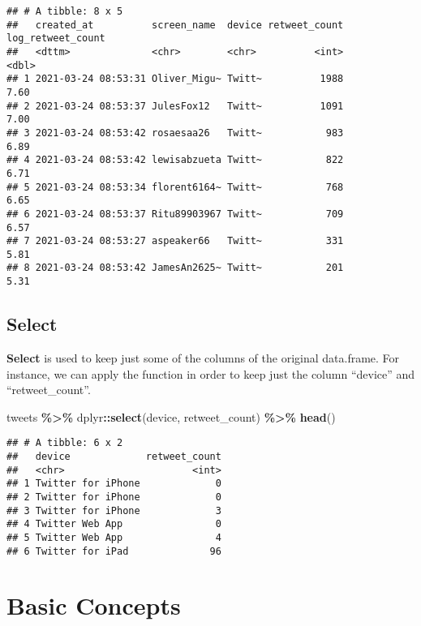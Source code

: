 \documentclass[
]{article}
\newenvironment{Shaded}{\begin{snugshade}}{\end{snugshade}}
\newcommand{\FunctionTok}[1]{\textcolor[rgb]{0.13,0.29,0.53}{\textbf{#1}}}
\newcommand{\NormalTok}[1]{#1}
\newcommand{\SpecialCharTok}[1]{\textcolor[rgb]{0.81,0.36,0.00}{\textbf{#1}}}
\begin{document}
\begin{verbatim}
## # A tibble: 8 x 5
##   created_at          screen_name  device retweet_count log_retweet_count
##   <dttm>              <chr>        <chr>          <int>             <dbl>
## 1 2021-03-24 08:53:31 Oliver_Migu~ Twitt~          1988              7.60
## 2 2021-03-24 08:53:37 JulesFox12   Twitt~          1091              7.00
## 3 2021-03-24 08:53:42 rosaesaa26   Twitt~           983              6.89
## 4 2021-03-24 08:53:42 lewisabzueta Twitt~           822              6.71
## 5 2021-03-24 08:53:34 florent6164~ Twitt~           768              6.65
## 6 2021-03-24 08:53:37 Ritu89903967 Twitt~           709              6.57
## 7 2021-03-24 08:53:27 aspeaker66   Twitt~           331              5.81
## 8 2021-03-24 08:53:42 JamesAn2625~ Twitt~           201              5.31
\end{verbatim}

\subsection{Select}\label{select}

\textbf{Select} is used to keep just some of the columns of the original data.frame. For instance, we can apply the function in order to keep just the column ``device'' and ``retweet\_count''.

\begin{Shaded}
\begin{Highlighting}[]
\NormalTok{tweets }\SpecialCharTok{\%\textgreater{}\%}
\NormalTok{  dplyr}\SpecialCharTok{::}\FunctionTok{select}\NormalTok{(device, retweet\_count) }\SpecialCharTok{\%\textgreater{}\%}
  \FunctionTok{head}\NormalTok{()}
\end{Highlighting}
\end{Shaded}

\begin{verbatim}
## # A tibble: 6 x 2
##   device             retweet_count
##   <chr>                      <int>
## 1 Twitter for iPhone             0
## 2 Twitter for iPhone             0
## 3 Twitter for iPhone             3
## 4 Twitter Web App                0
## 5 Twitter Web App                4
## 6 Twitter for iPad              96
\end{verbatim}

\section{Basic Concepts}\label{basic-concepts}
\end{document}
